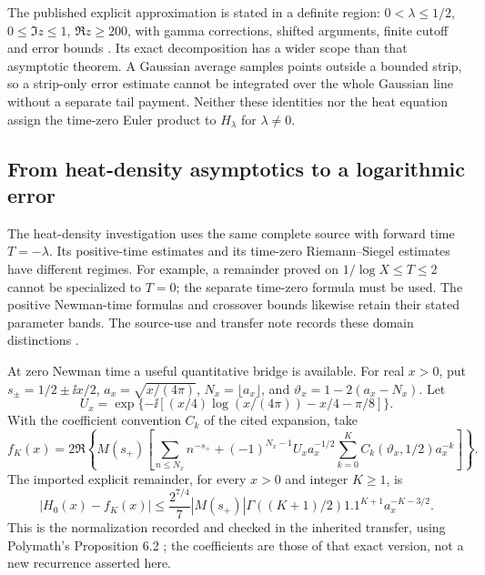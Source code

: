 The published explicit approximation is stated in a definite region:
\(0<\lambda\le1/2\), \(0\le\Im z\le1\), \(\Re z\ge200\), with
gamma corrections, shifted arguments, finite cutoff and error bounds
\cite[Theorem 1.3]{polymath2019heat}. Its exact decomposition has a wider
scope than that asymptotic theorem. A Gaussian average samples points
outside a bounded strip, so a strip-only error estimate cannot be
integrated over the whole Gaussian line without a separate tail payment.
Neither these identities nor the heat equation assign the time-zero
Euler product to \(H_\lambda\) for \(\lambda\ne0\).

\subsection{From heat-density asymptotics to a logarithmic error}
The heat-density investigation uses the same complete source with
forward time \(T=-\lambda\). Its positive-time estimates and its
time-zero Riemann--Siegel estimates have different regimes. For example,
a remainder proved on \(1/\log X\le T\le2\) cannot be specialized to
\(T=0\); the separate time-zero formula must be used. The positive
Newman-time formulas and crossover bounds likewise retain their stated
parameter bands. The source-use and transfer note records these domain
distinctions \cite{GNPHDATransfer}.

At zero Newman time a useful quantitative bridge is available. For
real \(x>0\), put \(s_\pm=1/2\pm\ii x/2\),
\(a_x=\sqrt{x/(4\pi)}\), \(N_x=\lfloor a_x\rfloor\), and
\(\vartheta_x=1-2(a_x-N_x)\). Let
\[
 U_x=\exp\{-\ii[(x/4)\log(x/(4\pi))-x/4-\pi/8]\}.
\]
With the coefficient convention \(C_k\) of the cited expansion, take
\begin{equation}\label{eq:RS-approximant}
 f_K(x)=2\Re\left\{M(s_+)\left[
 \sum_{n\le N_x}n^{-s_+}+(-1)^{N_x-1}U_xa_x^{-1/2}
             \sum_{k=0}^KC_k(\vartheta_x,1/2)a_x^{-k}\right]\right\}.
\end{equation}
The imported explicit remainder, for every \(x>0\) and integer \(K\ge1\), is
\begin{equation}\label{eq:RS-remainder}
 |H_0(x)-f_K(x)|\le\frac{2^{7/4}}7|M(s_+)|
       \Gamma((K+1)/2)1.1^{K+1}a_x^{-K-3/2}.
\end{equation}
This is the normalization recorded and checked in the inherited
transfer, using Polymath's Proposition 6.2
\cite{GNPHDATransfer,polymath2019heat}; the coefficients are those of
that exact version, not a new recurrence asserted here.

